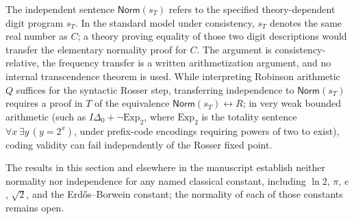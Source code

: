 \documentclass[11pt]{article}
\begin{document}
\begin{remark}\label{rem:classical}
The independent sentence \(\mathsf{Norm}(s_T)\) refers to the specified theory-dependent digit program \(s_T\). In the standard model under consistency, \(s_T\) denotes the same real number as \(C\); a theory proving equality of those two digit descriptions would transfer the elementary normality proof for \(C\). The argument is consistency-relative, the frequency transfer is a written arithmetization argument, and no internal transcendence theorem is used. While interpreting Robinson arithmetic \(Q\) suffices for the syntactic Rosser step, transferring independence to \(\mathsf{Norm}(s_T)\) requires a proof in \(T\) of the equivalence \(\mathsf{Norm}(s_T)\leftrightarrow R\); in very weak bounded arithmetic (such as \(I\Delta_0+\neg\mathrm{Exp}_2\), where \(\mathrm{Exp}_2\) is the totality sentence \(\forall x\,\exists y\,(y=2^x)\), under prefix-code encodings requiring powers of two to exist), coding validity can fail independently of the Rosser fixed point.

The results in this section and elsewhere in the manuscript establish neither normality nor independence for any named classical constant, including \(\ln 2\), \(\pi\), \(e\), \(\sqrt 2\), and the Erd\H{o}s--Borwein constant; the normality of each of those constants remains open.
\end{remark}
\end{document}
